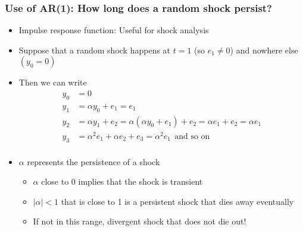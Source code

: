\documentclass[aspectratio=169]{beamer}
\begin{document}
\begin{frame}
\frametitle{Use of AR(1): How long does a random shock persist?}
\begin{itemize}
\item Impulse response function: Useful for shock analysis
\item Suppose that a random shock happens at $t=1$ (so $e_1\neq0$) and nowhere else $(y_0=0)$
\item Then we can write
\[
\begin{aligned}
y_0&=0\\ 
y_1 &=\alpha y_0+ e_1 =e_1\\
y_2 &= \alpha y_1+e_2 = \alpha(\alpha y_0+ e_1)+e_2 = \alpha e_1 + e_2 = \alpha e_1 \\
y_3 & = \alpha^2e_1 + \alpha e_2 + e_3 = \alpha^2 e_1\ \  \text{and so on}\\
\end{aligned}
\]
\item  $\alpha$ represents the persistence of a shock
\begin{itemize}
\item $\alpha$ close to 0 implies that the shock is transient
\item $|\alpha|<1$ that is close to 1 is a persistent shock that dies away eventually
\item If not in this range,  divergent shock that does not die out!
\end{itemize}
\end{itemize}
\end{frame}
\end{document}
